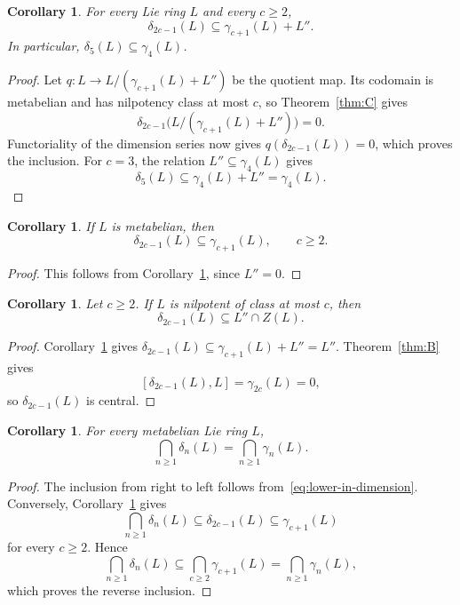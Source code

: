 \documentclass[a4paper,11pt,reqno]{amsart}
\newtheorem{corollary}[theorem]{Corollary}
\theoremstyle{definition}
\begin{document}
\begin{corollary}\label{cor:general-odd}
For every Lie ring $L$ and every $c\geq2$,
\[
              \delta_{2c-1}(L)\subseteq\gamma_{c+1}(L)+L''.
\]
In particular, $\delta_5(L)\subseteq\gamma_4(L)$.
\end{corollary}

\begin{proof}
Let $q:L\to L/(\gamma_{c+1}(L)+L'')$ be the quotient map.  Its codomain is
metabelian and has nilpotency class at most $c$, so Theorem~\ref{thm:C}
gives
\[
 \delta_{2c-1}\bigl(L/(\gamma_{c+1}(L)+L'')\bigr)=0.
\]
Functoriality of the dimension series now gives
$q(\delta_{2c-1}(L))=0$, which proves the inclusion.  For $c=3$, the
relation $L''\subseteq\gamma_4(L)$ gives
\[
 \delta_5(L)\subseteq\gamma_4(L)+L''=\gamma_4(L).
\]
\end{proof}

\begin{corollary}\label{cor:odd-metabelian}
If $L$ is metabelian, then
\[
                    \delta_{2c-1}(L)\subseteq\gamma_{c+1}(L),
                    \qquad c\geq2.
\]
\end{corollary}

\begin{proof}
This follows from Corollary~\ref{cor:general-odd}, since $L''=0$.
\end{proof}

\begin{corollary}\label{cor:nilpotent-central-derived}
Let $c\geq2$.  If $L$ is nilpotent of class at most $c$, then
\[
                         \delta_{2c-1}(L)\subseteq L''\cap Z(L).
\]
\end{corollary}

\begin{proof}
Corollary~\ref{cor:general-odd} gives
$\delta_{2c-1}(L)\subseteq\gamma_{c+1}(L)+L''=L''$.  Theorem~\ref{thm:B}
gives
\[
 [\delta_{2c-1}(L),L]=\gamma_{2c}(L)=0,
\]
so $\delta_{2c-1}(L)$ is central.
\end{proof}

\begin{corollary}\label{cor:omega}
For every metabelian Lie ring $L$,
\[
 \bigcap_{n\geq1}\delta_n(L)=\bigcap_{n\geq1}\gamma_n(L).
\]
\end{corollary}

\begin{proof}
The inclusion from right to left follows
from~\eqref{eq:lower-in-dimension}.  Conversely,
Corollary~\ref{cor:odd-metabelian} gives
\[
 \bigcap_{n\geq1}\delta_n(L)
 \subseteq\delta_{2c-1}(L)
 \subseteq\gamma_{c+1}(L)
 \]
for every $c\geq2$.  Hence
\[
 \bigcap_{n\geq1}\delta_n(L)
 \subseteq\bigcap_{c\geq2}\gamma_{c+1}(L)
 =\bigcap_{n\geq1}\gamma_n(L),
\]
which proves the reverse inclusion.
\end{proof}
\end{document}

